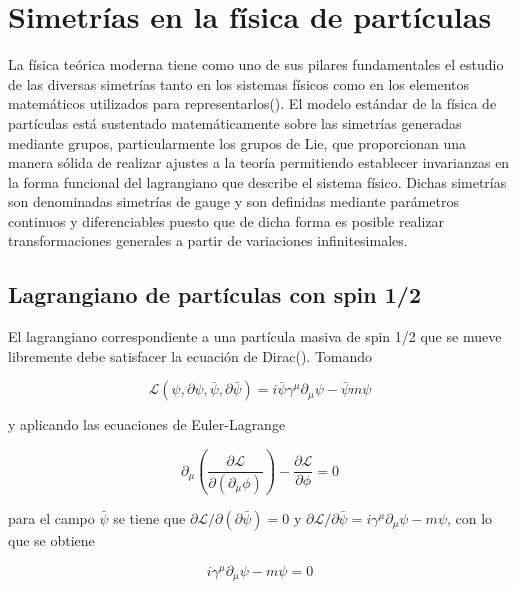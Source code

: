 \chapter{Simetrías en la física de partículas}

La física teórica moderna tiene como uno de sus pilares fundamentales el estudio de las diversas simetrías tanto en los sistemas físicos como en los elementos matemáticos utilizados para representarlos(\cite{cheng2000gauge}). El modelo estándar de la física de partículas está sustentado matemáticamente sobre las simetrías generadas mediante grupos, particularmente los grupos de Lie, que proporcionan una manera sólida de realizar ajustes a la teoría permitiendo establecer invarianzas en la forma funcional del lagrangiano que describe el sistema físico. Dichas simetrías son denominadas simetrías de gauge y son definidas mediante parámetros continuos y diferenciables puesto que de dicha forma es posible realizar transformaciones generales a partir de variaciones infinitesimales. 

\section{Lagrangiano de partículas con spin 1/2}

El lagrangiano correspondiente a una partícula masiva de spin 1/2 que se mueve libremente debe satisfacer la ecuación de Dirac(\cite{thomson2013modern}). Tomando

\begin{equation}
    \mathcal{L}(\psi, \partial \psi, \bar{\psi}, \partial \bar{\psi}) = i \bar{\psi}\gamma^{\mu}\partial_{\mu}\psi - \bar{\psi}m\psi
    \label{Lag12}
\end{equation}

y aplicando las ecuaciones de Euler-Lagrange

\begin{equation}
    \partial_{\mu}\left( \frac{\partial \mathcal{L}}{\partial(\partial_{\mu} \phi)} \right) - \frac{\partial \mathcal{L}}{\partial \phi} = 0
\end{equation}

para el campo $\bar{\psi}$ se tiene que $\partial \mathcal{L}/\partial (\partial \bar{\psi}) = 0$ y $\partial \mathcal{L}/\partial \bar{\psi} = i\gamma^{\mu}\partial_{\mu} \psi - m\psi$, con lo que se obtiene

\begin{equation}
    i\gamma^{\mu}\partial_{\mu} \psi - m\psi = 0
\end{equation}

